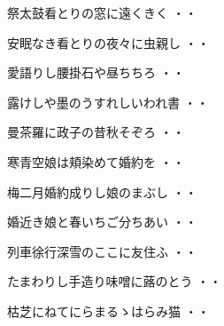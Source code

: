 \vspace{0.6cm}
\begin{shiika}祭太鼓看とりの窓に遠くきく
\hfill{・・}\end{shiika}
\vspace{0.6cm}
\begin{shiika}安眠なき看とりの夜々に虫親し
\hfill{・・}\end{shiika}
\vspace{0.6cm}
\begin{shiika}愛語りし腰掛石や昼ちちろ
\hfill{・・}\end{shiika}
\vspace{0.6cm}
\begin{shiika}露けしや墨のうすれしいわれ書
\hfill{・・}\end{shiika}
\vspace{0.6cm}
\begin{shiika}曼茶羅に政子の昔秋そぞろ
\hfill{・・}\end{shiika}
\vspace{0.6cm}
\begin{shiika}寒青空娘は頬染めて婚約を
\hfill{・・}\end{shiika}
\vspace{0.6cm}
\begin{shiika}梅二月婚約成りし娘のまぶし
\hfill{・・}\end{shiika}
\vspace{0.6cm}
\begin{shiika}婚近き娘と春いちご分ちあい
\hfill{・・}\end{shiika}
\vspace{0.6cm}
\begin{shiika}列車徐行深雪のここに友住ふ
\hfill{・・}\end{shiika}
\vspace{0.6cm}
\begin{shiika}たまわりし手造り味噌に蕗のとう
\hfill{・・}\end{shiika}
\vspace{0.6cm}
\begin{shiika}枯芝にねてにらまるゝはらみ猫
\hfill{・・}\end{shiika}
